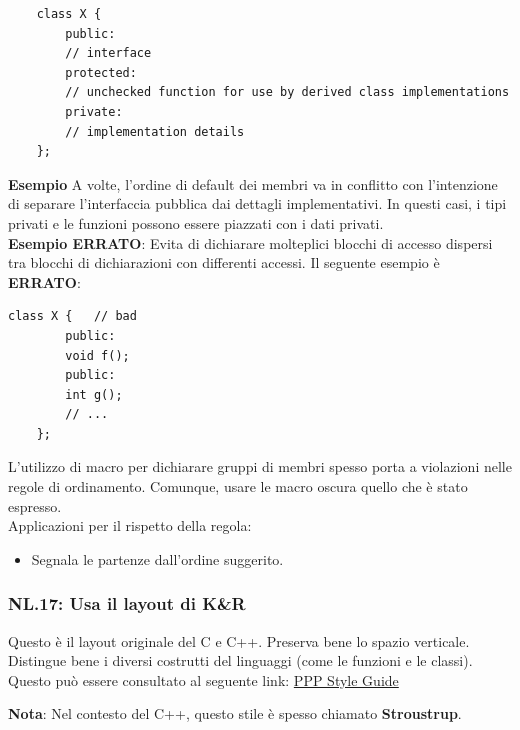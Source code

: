 \begin{lstlisting}
	class X {
		public:
		// interface
		protected:
		// unchecked function for use by derived class implementations
		private:
		// implementation details
	};
\end{lstlisting}

\textsf{\small \textbf{Esempio} A volte, l'ordine di default dei membri va in conflitto con l'intenzione di separare l'interfaccia pubblica dai dettagli implementativi. In questi casi, i tipi privati e le funzioni possono essere piazzati con i dati privati.} \\

\textsf{\small \textbf{Esempio ERRATO}: Evita di dichiarare molteplici blocchi di accesso dispersi tra blocchi di dichiarazioni con differenti accessi. Il seguente esempio è \textbf{\color{red}ERRATO}\normalcolor: } \\

\begin{lstlisting}[frame=single, rulecolor=\color{red}]
	class X {   // bad
		public:
		void f();
		public:
		int g();
		// ...
	};
\end{lstlisting}

\textsf{\small L'utilizzo di macro per dichiarare gruppi di membri spesso porta a violazioni nelle regole di ordinamento. Comunque, usare le macro oscura quello che è stato espresso. } \\

\textsf{\small Applicazioni per il rispetto della regola: } 

\begin{itemize}
	\item \textsf{\small Segnala le partenze dall'ordine suggerito.}
\end{itemize}

\subsubsection{NL.17: Usa il layout di K\&R }

\textsf{\small Questo è il layout originale del C e C++. Preserva bene lo spazio verticale. Distingue bene i diversi costrutti del linguaggi (come le funzioni e le classi).} \\

\textsf{\small Questo può essere consultato al seguente link: \href{https://www.stroustrup.com/Programming/PPP-style.pdf}{PPP Style Guide}}

\textsf{\small \textbf{Nota}: Nel contesto del C++, questo stile è spesso chiamato \textbf{Stroustrup}.} \\

